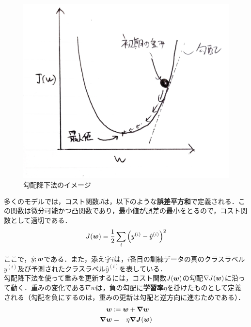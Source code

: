 \documentclass[a4j, 11pt]{jsarticle}
\numberwithin{equation}{section}
\newcommand{\mathbm}[1]{{\mbox{\boldmath $#1$}}}
\begin{document}
\begin{figure}[htbp]
    \centering
    \mbox{{\includegraphics[scale=0.15]{fig5_gradient.jpg}}}
    \caption{勾配降下法のイメージ}
    \label{勾配}
\end{figure}

\indent 多くのモデルでは，コスト関数$J$は，以下のような\textbf{誤差平方和}で定義される．この関数は微分可能かつ凸関数であり，最小値が誤差の最小をとるので，コスト関数として適切である．\\
\begin{equation}
	J(\mathbm{w}) = \frac{1}{2}\sum_{i}\left(y^{(i)}-\hat{y}^{(i)}\right)^2
	\label{SSE}
 \end{equation}

\indent ここで，$\hat{y};\mathbm{w}$である．また，添え字$i$は，$i$番目の訓練データの真のクラスラベル$y^{(i)}$及び予測されたクラスラベル$\hat{y}^{(i)}$を表している．\\
\indent 勾配降下法を使って重みを更新するには，コスト関数$J(\mathbm{w})$の勾配$\nabla J(\mathbm{w})$に沿って動く．重みの変化である$\nabla w$は，負の勾配に\textbf{学習率}$\eta$を掛けたものとして定義される（勾配を負にするのは，重みの更新は勾配と逆方向に進むためである）．\\

\begin{align} 
	\mathbm{w}&:=\mathbm{w}+\mathbm{\nabla w}\\
	\mathbm{\nabla w} &= -\eta\mathbm{\nabla J}(\mathbm{w})
\end{align}
\end{document}
